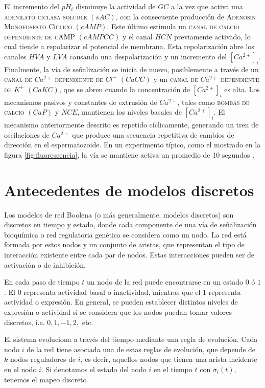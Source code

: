 El incremento del $pH_i$ disminuye la actividad de $GC$ a la vez que activa una \textsc{adenilato ciclasa soluble} $(sAC)$, con la consecuente producción de \textsc{Adenosín Monofosfato Cíclico} $(cAMP)$. Este último estimula un \textsc{canal de calcio dependiente de cAMP} $(cAMPCC)$ y el canal $HCN$ previamente activado, lo cual tiende a repolarizar el potencial de membrana. Esta repolarización abre los canales $HVA$ y $LVA$ causando una despolarización y un incremento del $[Ca^{2+}]_i$. Finalmente, la vía de señalización se inicia de nuevo, posiblemente a través de un \textsc{canal de} $Ca^{2+}$ \textsc{dependiente de} $Cl^-$ $(CaCC)$ y un \textsc{canal de} $Ca^{2+}$ \textsc{dependiente de} $K^+$ $(CaKC)$, que se abren cuando la concentración de $[Ca^{2+}]_i$ es alta. Los mecanismos pasivos y constantes de extrusión de $Ca^{2+}$, tales como \textsc{bombas de calcio} $(CaP)$ y $NCE$, mantienen los niveles basales de $[Ca^{2+}]_i$. El mecanismo anteriormente descrito es repetido cíclicamente, generando un tren de oscilaciones de $Ca^{2+}$ que produce una secuencia repetitiva de cambios de dirección en el espermatozoide. En un experimento típico, como el mostrado en la figura \ref{fig:fluorescencia}, la vía se mantiene activa un promedio de 10 segundos \citeauthor{Wood2003} \citep{Wood2003}.

\section{Antecedentes de modelos discretos}

Los modelos de red Boolena (o más generalmente, modelos discretos) son discretos en tiempo y estado, donde cada componente de una vía de señalización  bioquímica o red regulatoria genética se considera como un nodo. La red está formada por estos nodos y un conjunto de aristas, que representan el tipo de interacción existente entre cada par de nodos. Estas interacciones pueden ser de activación o de inhibición. 

En cada paso de tiempo $t$ un nodo de la red puede encontrarse en un estado $0$ ó $1$. El $0$ representa actividad basal o inactividad, mientras que el $1$ representa actividad o expresión. En general, se pueden establecer distintos niveles de expresión o actividad si se considera que los nodos puedan tomar valores discretos, i.e. $0, 1, -1, 2,$ etc.

El sistema evoluciona a través del tiempo mediante una regla de evolución. Cada nodo $i$ de la red tiene asociada una de estas reglas de evolución,  que depende de $k$ nodos reguladores de $i$, es decir, aquellos nodos que tienen una arista incidente en el nodo $i$. Si denotamos el estado del nodo $i$ en el tiempo $t$ con $\sigma_i(t)$, tenemos el mapeo discreto

